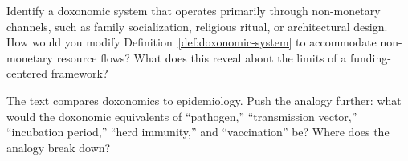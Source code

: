 \begin{exercise}
\label{ex:ch1-nonmonetary}
Identify a doxonomic system that operates primarily through non-monetary channels, such as family socialization, religious ritual, or architectural design.
How would you modify Definition~\ref{def:doxonomic-system} to accommodate non-monetary resource flows?
What does this reveal about the limits of a funding-centered framework?
\end{exercise}

\begin{exercise}
\label{ex:ch1-epidemiology}
The text compares doxonomics to epidemiology.
Push the analogy further: what would the doxonomic equivalents of ``pathogen,'' ``transmission vector,'' ``incubation period,'' ``herd immunity,'' and ``vaccination'' be?
Where does the analogy break down?
\end{exercise}
